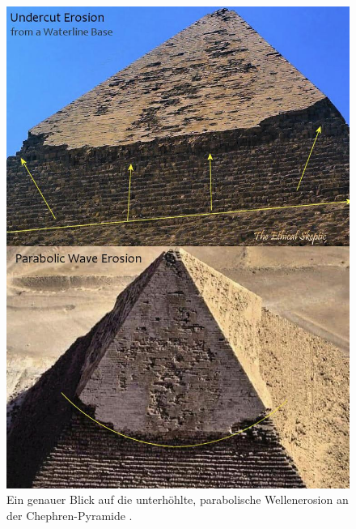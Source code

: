 \documentclass[10pt,twocolumn,letterpaper]{article}
\begin{document}
\begin{figure}[H]
\begin{center}
   \includegraphics[width=1\linewidth]{wave.jpg}
\end{center}
   \caption{Ein genauer Blick auf die unterhöhlte, parabolische Wellenerosion an der Chephren-Pyramide \cite{27}.}
\label{fig:19}
\label{fig:onecol}
\end{figure}
\end{document}
